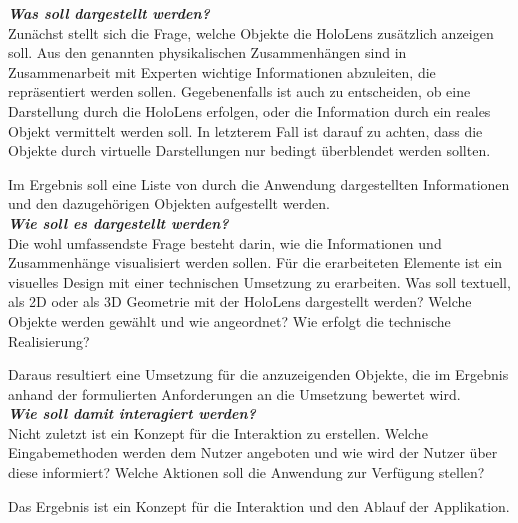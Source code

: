 \textbf{\textit{Was soll dargestellt werden?}}\\
Zunächst stellt sich die Frage, welche Objekte die HoloLens zusätzlich anzeigen soll. Aus den genannten physikalischen Zusammenhängen sind in Zusammenarbeit mit Experten wichtige Informationen abzuleiten, die repräsentiert werden sollen. Gegebenenfalls ist auch zu entscheiden, ob eine Darstellung durch die HoloLens erfolgen, oder die Information durch ein reales Objekt vermittelt werden soll. In letzterem Fall ist darauf zu achten, dass die Objekte durch virtuelle Darstellungen nur bedingt überblendet werden sollten.
\par
\noindent\hspace*{5mm}
Im Ergebnis soll eine Liste von durch die Anwendung dargestellten Informationen und den dazugehörigen Objekten aufgestellt werden.\\

\textbf{\textit{Wie soll es dargestellt werden?}}\\
Die wohl umfassendste Frage besteht darin, wie die Informationen und Zusammenhänge visualisiert werden sollen. Für die erarbeiteten Elemente ist ein visuelles Design mit einer technischen Umsetzung zu erarbeiten. Was soll textuell, als 2D oder als 3D Geometrie mit der HoloLens dargestellt werden? Welche Objekte werden gewählt und wie angeordnet? Wie erfolgt die technische Realisierung?
\par
\noindent\hspace*{5mm}
Daraus resultiert eine Umsetzung für die anzuzeigenden Objekte, die im Ergebnis anhand der formulierten Anforderungen an die Umsetzung bewertet wird.\\

\textbf{\textit{Wie soll damit interagiert werden?}}\\
Nicht zuletzt ist ein Konzept für die Interaktion zu erstellen. Welche Eingabemethoden werden dem Nutzer angeboten und wie wird der Nutzer über diese informiert? Welche Aktionen soll die Anwendung zur Verfügung stellen?
\par
\noindent\hspace*{5mm}
Das Ergebnis ist ein Konzept für die Interaktion und den Ablauf der Applikation.
